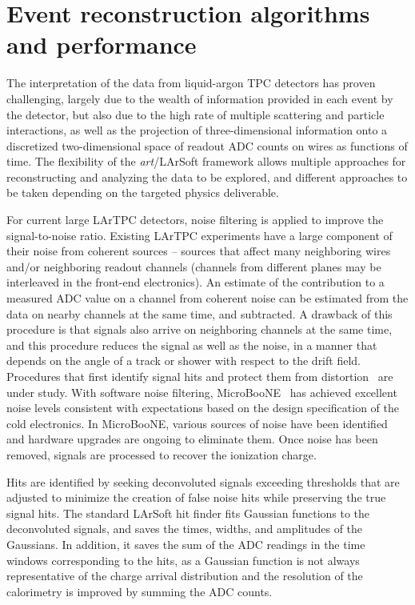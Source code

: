 \section{Event reconstruction algorithms and performance}
\label{sec:larsoftreco}

The interpretation of the data from liquid-argon TPC detectors has
proven challenging, largely due to the wealth of information provided
in each event by the detector, but also due to the high rate of
multiple scattering and particle interactions, as well as the
projection of three-dimensional information onto a discretized
two-dimensional space of readout ADC counts on wires as functions of
time.  The flexibility of the {\textit{art}}/LArSoft framework allows
multiple approaches for reconstructing and analyzing the data to be
explored, and different approaches to be taken depending on the targeted
physics deliverable.


For current large LArTPC detectors, noise filtering is applied to improve
the signal-to-noise ratio.  Existing LArTPC experiments have a
large component of their noise from coherent sources -- sources that
affect many neighboring wires and/or neighboring readout channels
(channels from different planes may be interleaved in the front-end
electronics).  An estimate of the contribution to a measured ADC value on a channel from
coherent noise can be estimated from the data on nearby channels at the same time, and subtracted.
A drawback of this procedure is that signals also arrive on neighboring
channels at the same time, and this procedure reduces the signal as
well as the noise, in a manner that depends on the angle of a track or
shower with respect to the drift field.  Procedures that first
identify signal hits and protect them from distortion~\cite{Mooney:2015kke} 
are under study. With software noise filtering, MicroBooNE~\cite{noise_filter}
has achieved excellent noise levels consistent with expectations based on 
the design specification of the cold electronics. %
In MicroBooNE, various 
sources of noise have been identified and hardware upgrades 
are ongoing to eliminate them.   Once noise has been removed,
signals are processed to recover the ionization charge. 

Hits are identified by seeking deconvoluted signals exceeding
thresholds that are adjusted to minimize the creation of false noise
hits while preserving the true signal hits.  The standard LArSoft hit
finder fits Gaussian functions to the deconvoluted signals, and saves the
times, widths, and amplitudes of the Gaussians.  In addition, it saves the sum of
the ADC readings in the time windows corresponding to the hits, as a
Gaussian function is not always representative of the charge arrival
distribution and the resolution of the calorimetry is improved by
summing the ADC counts.

